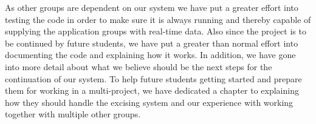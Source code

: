 As other groups are dependent on our system we have put a greater effort into testing the code in order to make sure it is always running and thereby capable of supplying the application groups with real-time data.
Also since the project is to be continued by future students, we have put a greater than normal effort into documenting the code and explaining how it works. In addition, we have gone into more detail about what we believe should be the next steps for the continuation of our system.
To help future students getting started and prepare them for working in a multi-project, we have dedicated a chapter to explaining how they should handle the excising system and our experience with working together with multiple other groups. 